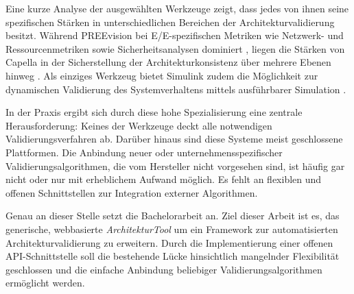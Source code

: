 Eine kurze Analyse der ausgewählten Werkzeuge zeigt, dass jedes von ihnen seine spezifischen Stärken in unterschiedlichen Bereichen der Architekturvalidierung besitzt. Während PREEvision bei E/E-spezifischen Metriken wie Netzwerk- und Ressourcenmetriken sowie Sicherheitsanalysen dominiert \cite{schauffele2016architectural}, liegen die Stärken von Capella in der Sicherstellung der Architekturkonsistenz über mehrere Ebenen hinweg \cite{roques2016mbse}. Als einziges Werkzeug bietet Simulink zudem die Möglichkeit zur dynamischen Validierung des Systemverhaltens mittels ausführbarer Simulation \cite{themathworksinc.2025system}.

In der Praxis ergibt sich durch diese hohe Spezialisierung eine zentrale Herausforderung: Keines der Werkzeuge deckt alle notwendigen Validierungsverfahren ab. Darüber hinaus sind diese Systeme meist geschlossene Plattformen. Die Anbindung neuer oder unternehmensspezifischer Validierungsalgorithmen, die vom Hersteller nicht vorgesehen sind, ist häufig gar nicht oder nur mit erheblichem Aufwand möglich. Es fehlt an flexiblen und offenen Schnittstellen zur Integration externer Algorithmen.

\break
Genau an dieser Stelle setzt die Bachelorarbeit an. Ziel dieser Arbeit ist es, das generische, webbasierte \textit{ArchitekturTool} um ein Framework zur automatisierten Architekturvalidierung zu erweitern. Durch die Implementierung einer offenen API-Schnittstelle soll die bestehende Lücke hinsichtlich mangelnder Flexibilität geschlossen und die einfache Anbindung beliebiger Validierungsalgorithmen ermöglicht werden.
